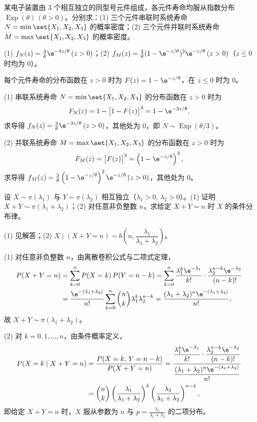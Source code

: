 \begin{exercise}
某电子装置由 $3$ 个相互独立的同型号元件组成，各元件寿命均服从指数分布 $\operatorname{Exp}(\theta)\,(\theta>0)$。分别求：(1) 三个元件串联时系统寿命 $N=\min\set{X_1,X_2,X_3}$ 的概率密度；(2) 三个元件并联时系统寿命 $M=\max\set{X_1,X_2,X_3}$ 的概率密度。
\begin{answer}
(1) $f_N(z)=\frac{3}{\theta}\e^{-3z/\theta}\,(z>0)$；(2) $f_M(z)=\frac{3}{\theta}(1-\e^{-z/\theta})^2\e^{-z/\theta}\,(z>0)$（$z\le 0$ 时均为 $0$）。
\end{answer}
\begin{solution}
每个元件寿命的分布函数在 $z>0$ 时为 $F(z)=1-\e^{-z/\theta}$，在 $z\le 0$ 时为 $0$。

(1) 串联系统寿命 $N=\min\set{X_1,X_2,X_3}$ 的分布函数在 $z>0$ 时为
\[
  F_N(z)=1-\bigl[1-F(z)\bigr]^3=1-\e^{-3z/\theta},
\]
求导得 $f_N(z)=\frac{3}{\theta}\e^{-3z/\theta}\,(z>0)$，其他处为 $0$，即 $N\sim\operatorname{Exp}(\theta/3)$。

(2) 并联系统寿命 $M=\max\set{X_1,X_2,X_3}$ 的分布函数在 $z>0$ 时为
\[
  F_M(z)=\bigl[F(z)\bigr]^3=\left(1-\e^{-z/\theta}\right)^3,
\]
求导得 $f_M(z)=\frac{3}{\theta}\left(1-\e^{-z/\theta}\right)^2\e^{-z/\theta}\,(z>0)$，其他处为 $0$。
\end{solution}
\end{exercise}

\begin{exercise}
设 $X\sim\pi(\lambda_1)$ 与 $Y\sim\pi(\lambda_2)$ 相互独立（$\lambda_1>0,\,\lambda_2>0$）。(1) 证明 $X+Y\sim\pi(\lambda_1+\lambda_2)$；(2) 对任意非负整数 $n$，求给定 $X+Y=n$ 时 $X$ 的条件分布律。
\begin{answer}
(1) 见解答；(2) $X\mid (X+Y=n)\sim b\!\left(n,\dfrac{\lambda_1}{\lambda_1+\lambda_2}\right)$。
\end{answer}
\begin{solution}
(1) 对任意非负整数 $n$，由离散卷积公式与二项式定理，
\[
\begin{aligned}
  P(X+Y=n)&=\sum_{k=0}^{n}P(X=k)\,P(Y=n-k)
  =\sum_{k=0}^{n}\frac{\lambda_1^k\e^{-\lambda_1}}{k!}\cdot\frac{\lambda_2^{n-k}\e^{-\lambda_2}}{(n-k)!}\\
  &=\frac{\e^{-(\lambda_1+\lambda_2)}}{n!}\sum_{k=0}^{n}\binom{n}{k}\lambda_1^k\lambda_2^{n-k}
  =\frac{(\lambda_1+\lambda_2)^n\e^{-(\lambda_1+\lambda_2)}}{n!},
\end{aligned}
\]
故 $X+Y\sim\pi(\lambda_1+\lambda_2)$。

(2) 对 $k=0,1,\ldots,n$，由条件概率定义，
\[
\begin{aligned}
  P(X=k\mid X+Y=n)
  &=\frac{P(X=k,\,Y=n-k)}{P(X+Y=n)}
  =\frac{\dfrac{\lambda_1^k\e^{-\lambda_1}}{k!}\cdot\dfrac{\lambda_2^{n-k}\e^{-\lambda_2}}{(n-k)!}}{\dfrac{(\lambda_1+\lambda_2)^n\e^{-(\lambda_1+\lambda_2)}}{n!}}\\
  &=\binom{n}{k}\left(\frac{\lambda_1}{\lambda_1+\lambda_2}\right)^k\left(\frac{\lambda_2}{\lambda_1+\lambda_2}\right)^{n-k},
\end{aligned}
\]
即给定 $X+Y=n$ 时，$X$ 服从参数为 $n$ 与 $p=\frac{\lambda_1}{\lambda_1+\lambda_2}$ 的二项分布。
\end{solution}
\end{exercise}

